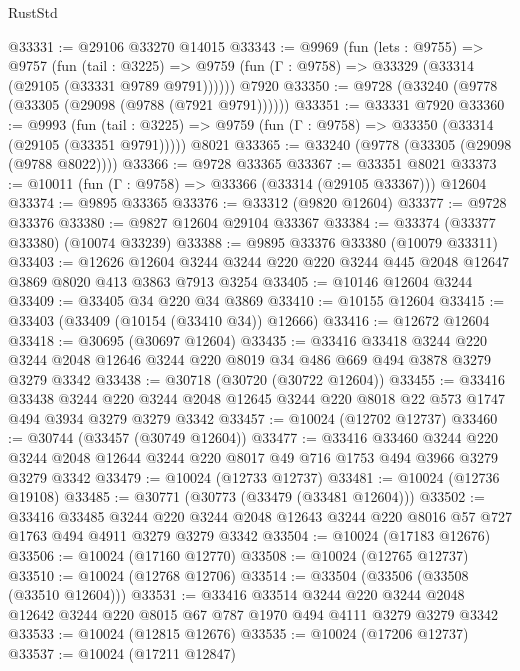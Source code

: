 \begin{lexlean}{RustStd}
\begin{coremodule}
{\begin{coremodule}
{{{{{{{{{{{{{{{{{{{{{{{{{{@33331 := @29106 @33270 @14015
@33343 := @9969
    (fun (lets : @9755) =>
    @9757
      (fun (tail : @3225) =>
      @9759 (fun (Γ : @9758) => @33329 (@33314 (@29105 (@33331 @9789 @9791))))))
    @7920
@33350 := @9728 (@33240 (@9778 (@33305 (@29098 (@9788 (@7921 @9791))))))
@33351 := @33331 @7920
@33360 := @9993
    (fun (tail : @3225) => @9759 (fun (Γ : @9758) => @33350 (@33314 (@29105 (@33351 @9791)))))
    @8021
@33365 := @33240 (@9778 (@33305 (@29098 (@9788 @8022))))
@33366 := @9728 @33365
@33367 := @33351 @8021
@33373 := @10011 (fun (Γ : @9758) => @33366 (@33314 (@29105 @33367))) @12604
@33374 := @9895 @33365
@33376 := @33312 (@9820 @12604)
@33377 := @9728 @33376
@33380 := @9827 @12604 @29104 @33367
@33384 := @33374 (@33377 @33380) (@10074 @33239)
@33388 := @9895 @33376 @33380 (@10079 @33311)
@33403 := @12626
    @12604
    @3244
    @3244
    @220
    @220
    @3244
    @445
    @2048
    @12647
    @3869
    @8020
    @413
    @3863
    @7913
    @3254
@33405 := @10146 @12604 @3244
@33409 := @33405 @34 @220 @34 @3869
@33410 := @10155 @12604
@33415 := @33403 (@33409 (@10154 (@33410 @34)) @12666)
@33416 := @12672 @12604
@33418 := @30695 (@30697 @12604)
@33435 := @33416
    @33418
    @3244
    @220
    @3244
    @2048
    @12646
    @3244
    @220
    @8019
    @34
    @486
    @669
    @494
    @3878
    @3279
    @3279
    @3342
@33438 := @30718 (@30720 (@30722 @12604))
@33455 := @33416
    @33438
    @3244
    @220
    @3244
    @2048
    @12645
    @3244
    @220
    @8018
    @22
    @573
    @1747
    @494
    @3934
    @3279
    @3279
    @3342
@33457 := @10024 (@12702 @12737)
@33460 := @30744 (@33457 (@30749 @12604))
@33477 := @33416
    @33460
    @3244
    @220
    @3244
    @2048
    @12644
    @3244
    @220
    @8017
    @49
    @716
    @1753
    @494
    @3966
    @3279
    @3279
    @3342
@33479 := @10024 (@12733 @12737)
@33481 := @10024 (@12736 @19108)
@33485 := @30771 (@30773 (@33479 (@33481 @12604)))
@33502 := @33416
    @33485
    @3244
    @220
    @3244
    @2048
    @12643
    @3244
    @220
    @8016
    @57
    @727
    @1763
    @494
    @4911
    @3279
    @3279
    @3342
@33504 := @10024 (@17183 @12676)
@33506 := @10024 (@17160 @12770)
@33508 := @10024 (@12765 @12737)
@33510 := @10024 (@12768 @12706)
@33514 := @33504 (@33506 (@33508 (@33510 @12604)))
@33531 := @33416
    @33514
    @3244
    @220
    @3244
    @2048
    @12642
    @3244
    @220
    @8015
    @67
    @787
    @1970
    @494
    @4111
    @3279
    @3279
    @3342
@33533 := @10024 (@12815 @12676)
@33535 := @10024 (@17206 @12737)
@33537 := @10024 (@17211 @12847)
}}}}}}}}}}}}}}}}}}}}}}}}}}
\end{coremodule}}
\end{coremodule}
\end{lexlean}
